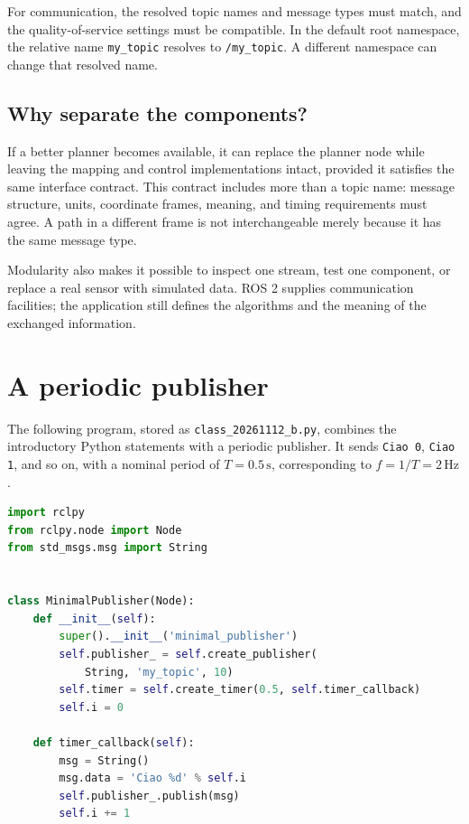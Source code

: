 For communication, the resolved topic names and message types must match,
and the quality-of-service settings must be compatible. In the default
root namespace, the relative name \texttt{my\_topic} resolves to
\texttt{/my\_topic}. A different namespace can change that resolved name.

\subsection{Why separate the components?}
If a better planner becomes available, it can replace the planner node
while leaving the mapping and control implementations intact, provided
it satisfies the same interface contract. This contract includes more
than a topic name: message structure, units, coordinate frames, meaning,
and timing requirements must agree. A path in a different frame is not
interchangeable merely because it has the same message type.

Modularity also makes it possible to inspect one stream, test one component,
or replace a real sensor with simulated data. ROS 2 supplies communication
facilities; the application still defines the algorithms and the meaning
of the exchanged information.

\section{A periodic publisher}
\label{sec:l14-publisher}
The following program, stored as \texttt{class\_20261112\_b.py}, combines
the introductory Python statements with a periodic publisher. It sends
\texttt{Ciao 0}, \texttt{Ciao 1}, and so on, with a nominal period of
$T=0.5\,\mathrm{s}$, corresponding to $f=1/T=2\,\mathrm{Hz}$.

\begin{lstlisting}[style=robotcode,language=Python]
import rclpy
from rclpy.node import Node
from std_msgs.msg import String


class MinimalPublisher(Node):
    def __init__(self):
        super().__init__('minimal_publisher')
        self.publisher_ = self.create_publisher(
            String, 'my_topic', 10)
        self.timer = self.create_timer(0.5, self.timer_callback)
        self.i = 0

    def timer_callback(self):
        msg = String()
        msg.data = 'Ciao %d' % self.i
        self.publisher_.publish(msg)
        self.i += 1
\end{lstlisting}


